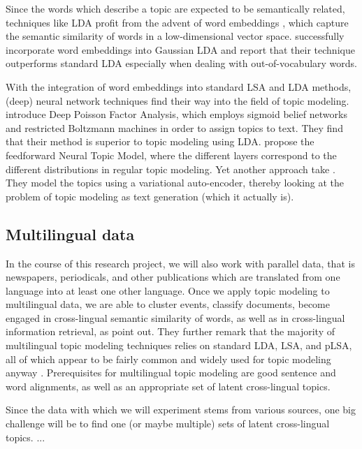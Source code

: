 Since the words which describe a topic are expected to be semantically related, techniques like LDA profit from the advent of word embeddings \citep{mikolovdistributed2013,bengioneural2003}, which capture the semantic similarity of words in a low-dimensional vector space. \citet{dasgaussian2015} successfully incorporate word embeddings into Gaussian LDA and report that their technique outperforms standard LDA especially when dealing with out-of-vocabulary words.

With the integration of word embeddings into standard LSA and LDA methods, (deep) neural network techniques find their way into the field of topic modeling. \citet{ganscalable2015} introduce Deep Poisson Factor Analysis, which employs sigmoid belief networks and restricted Boltzmann machines in order to assign topics to text. They find that their method is superior to topic modeling using LDA. \citet{cao_novel_2015} propose the feedforward Neural Topic Model, where the different layers correspond to the different distributions in regular topic modeling. Yet another approach take \citet{miao_neural_2016}. They model the topics using a variational auto-encoder, thereby looking at the problem of topic modeling as text generation (which it actually is).

\subsection{Multilingual data}
In the course of this research project, we will also work with parallel data, that is newspapers, periodicals, and other publications which are translated from one language into at least one other language. Once we apply topic modeling to multilingual data, we are able to cluster events, classify documents, become engaged in cross-lingual semantic similarity of words, as well as in cross-lingual information retrieval, as \citet{vulicprobabilistic2015} point out. They further remark that the majority of multilingual topic modeling techniques relies on standard LDA, LSA, and pLSA, all of which appear to be fairly common and widely used for topic modeling anyway \citep{dumaisautomatic1997,mimnopolylingual2009,zhangcrosslingual2010,nicross2011}. Prerequisites for multilingual topic modeling are good sentence and word alignments, as well as an appropriate set of latent cross-lingual topics.

Since the data with which we will experiment stems from various sources, one big challenge will be to find one (or maybe multiple) sets of latent cross-lingual topics.  ...


